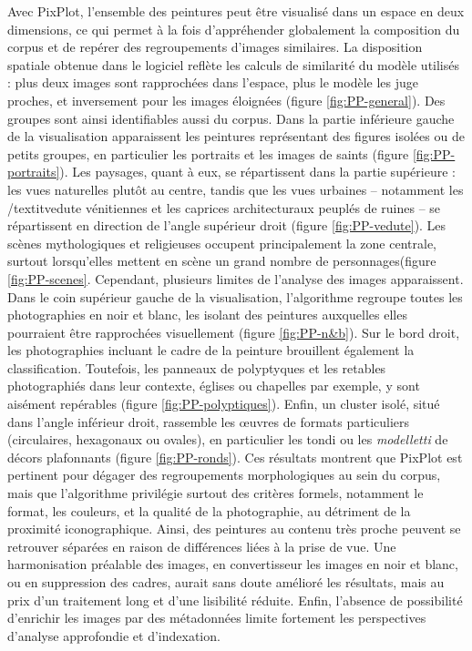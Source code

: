 Avec PixPlot, l’ensemble des peintures peut être visualisé dans un espace en deux dimensions, ce qui permet à la fois d’appréhender globalement la composition du corpus et de repérer des regroupements d’images similaires. La disposition spatiale obtenue dans le logiciel reflète les calculs de similarité du modèle utilisés : plus deux images sont rapprochées dans l’espace, plus le modèle les juge proches, et inversement pour les images éloignées (figure \ref{fig:PP-general}). Des groupes sont ainsi identifiables aussi du corpus. Dans la partie inférieure gauche de la visualisation apparaissent les peintures représentant des figures isolées ou de petits groupes, en particulier les portraits et les images de saints (figure \ref{fig:PP-portraits}). Les paysages, quant à eux, se répartissent dans la partie supérieure : les vues naturelles plutôt au centre, tandis que les vues urbaines – notamment les /textit{vedute} vénitiennes et les caprices architecturaux peuplés de ruines – se répartissent en direction de l’angle supérieur droit (figure \ref{fig:PP-vedute}). Les scènes mythologiques et religieuses occupent principalement la zone centrale, surtout lorsqu’elles mettent en scène un grand nombre de personnages(figure \ref{fig:PP-scenes}. Cependant, plusieurs limites de l’analyse des images apparaissent. Dans le coin supérieur gauche de la visualisation, l’algorithme regroupe toutes les photographies en noir et blanc, les isolant des peintures auxquelles elles pourraient être rapprochées visuellement (figure \ref{fig:PP-n&b}). Sur le bord droit, les photographies incluant le cadre de la peinture brouillent également la classification. Toutefois, les panneaux de polyptyques et les retables photographiés dans leur contexte, églises ou chapelles par exemple, y sont aisément repérables (figure \ref{fig:PP-polyptiques}). Enfin, un cluster isolé, situé dans l’angle inférieur droit, rassemble les œuvres de formats particuliers (circulaires, hexagonaux ou ovales), en particulier les tondi ou les \textit{modelletti} de décors plafonnants (figure \ref{fig:PP-ronds}). Ces résultats montrent que PixPlot est pertinent pour dégager des regroupements morphologiques au sein du corpus, mais que l’algorithme privilégie surtout des critères formels, notamment le format, les couleurs, et la qualité de la photographie, au détriment de la proximité iconographique. Ainsi, des peintures au contenu très proche peuvent se retrouver séparées en raison de différences liées à la prise de vue. Une harmonisation préalable des images, en convertisseur les images en noir et blanc, ou en suppression des cadres, aurait sans doute amélioré les résultats, mais au prix d’un traitement long et d’une lisibilité réduite. Enfin, l’absence de possibilité d’enrichir les images par des métadonnées limite fortement les perspectives d’analyse approfondie et d’indexation.

